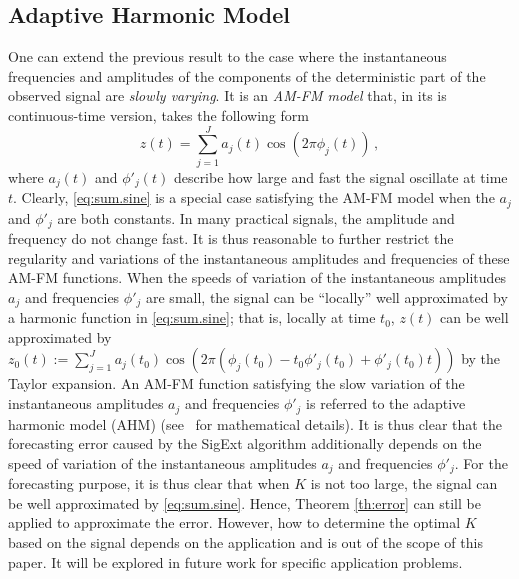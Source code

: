 \subsection{Adaptive Harmonic Model}\label{RemarkAHM}

One can extend the previous result to the case where the instantaneous frequencies and amplitudes of the components of the deterministic part of the observed signal are {\em slowly varying}. It is an \textit{AM-FM model} that, in its is continuous-time version, takes the following form
\begin{equation}
z(t) = \sum_{j=1}^J a_j(t)\cos(2\pi\phi_j(t))\,,
\end{equation}
where $a_j(t)$ and $\phi'_j(t)$ describe how large and fast the signal oscillate at time $t$. 
Clearly, \eqref{eq:sum.sine} is a special case satisfying the AM-FM model when the $a_j$ and $\phi'_j$ are both constants. 
%
In many practical signals, the amplitude and frequency do not change fast. It is thus reasonable to further restrict the regularity and variations of the instantaneous amplitudes and frequencies of these AM-FM functions. When the speeds of variation of the instantaneous amplitudes $a_j$ and frequencies $\phi'_j$ are small, the signal can be ``locally'' well approximated by a harmonic function in \eqref{eq:sum.sine}; that is, 
%
locally at time $t_0$, $z(t)$ can be well approximated by $z_0(t) := \sum_{j=1}^J a_j(t_0)\cos(2\pi(\phi_j(t_0)-t_0\phi'_j(t_0)+\phi'_j(t_0)t))$ by the Taylor expansion. An AM-FM function satisfying the slow variation of the instantaneous amplitudes $a_j$ and frequencies $\phi'_j$ is referred to the adaptive harmonic model (AHM) (see~\cite{Chen14nonparametric,Daubechies16conceft} for mathematical details).
It is thus clear that the forecasting error caused by the {\sf SigExt} algorithm additionally depends on the speed of variation of the instantaneous amplitudes $a_j$ and frequencies $\phi'_j$. 
%
For the forecasting purpose, it is thus clear that when $K$ is not too large, the signal can be well approximated by \eqref{eq:sum.sine}. Hence, Theorem \ref{th:error} can still be applied to approximate the error. However, how to determine the optimal $K$ based on the signal depends on the application and is out of the scope of this paper. It will be explored in future work for specific application problems.


